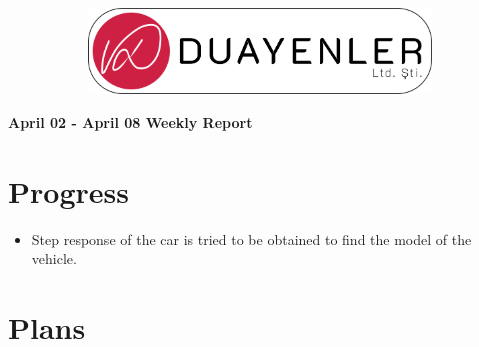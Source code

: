 \documentclass[a4paper,12pt]{article}
\begin{document}
	
\begin{figure}
	\vspace*{-.7cm}
	\centering
	\begin{figure}[H]
		\centering
		\setlength{\unitlength}{\textwidth} 
		\includegraphics[width=0.9\unitlength]{../../../documents/logos/logo3-with-stroke}
	\end{figure}
\end{figure}
\vspace*{-1.7cm}
\begin{center}
	\Large\textbf{April 02 - April 08 Weekly Report}
	\end{center}
\section{Progress}
\begin{itemize}
 
	 \item Step response of the car is tried to be obtained  to find the model of the vehicle.
	 
	 
	
	\end{itemize}

\section{Plans}
\end{document}
